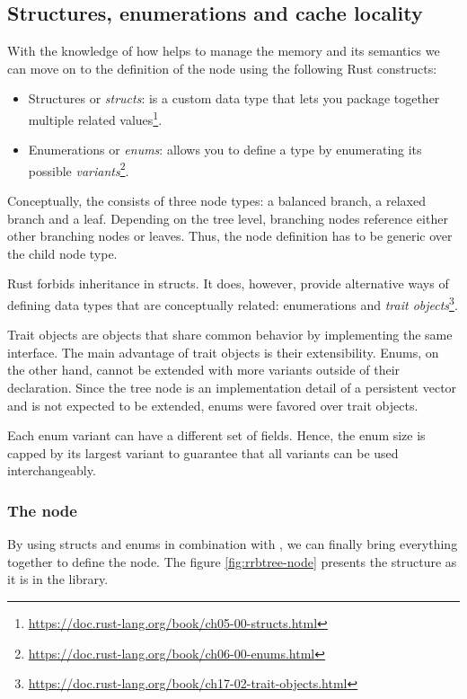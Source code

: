 \subsection{Structures, enumerations and cache locality}
With the knowledge of how \rc{} helps to manage the memory and its semantics we can move on to the definition of the \rrbtree{} node using the following Rust constructs:
\begin{itemize}
    \item Structures or \emph{structs}: is a custom data type that lets you package together multiple related values\footnote{\url{https://doc.rust-lang.org/book/ch05-00-structs.html}}.
    \item Enumerations or \emph{enums}: allows you to define a type by enumerating its possible \emph{variants}\footnote{\url{https://doc.rust-lang.org/book/ch06-00-enums.html}}.
\end{itemize}

Conceptually, the \rrbtree{} consists of three node types: a balanced branch, a relaxed branch and a leaf. Depending on the tree level, branching nodes reference either other branching nodes or leaves. Thus, the node definition has to be generic over the child node type.

Rust forbids inheritance in structs. It does, however, provide alternative ways of defining data types that are conceptually related: enumerations and \emph{trait objects}\footnote{\url{https://doc.rust-lang.org/book/ch17-02-trait-objects.html}}.

Trait objects are objects that share common behavior by implementing the same interface. The main advantage of trait objects is their extensibility. Enums, on the other hand, cannot be extended with more variants outside of their declaration. Since the tree node is an implementation detail of a persistent vector and is not expected to be extended, enums were favored over trait objects.

Each enum variant can have a different set of fields. Hence, the enum size is capped by its largest variant to guarantee that all variants can be used interchangeably.

\subsubsection*{The \rrbtree{} node}

By using structs and enums in combination with \rc{}, we can finally bring everything together to define the \rrbtree{} node. The figure \ref{fig:rrbtree-node} presents the structure as it is in the library.


